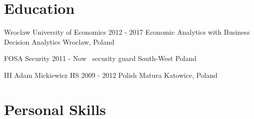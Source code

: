 \documentclass{piotrcv}
\begin{document}
\section{Education}

\begin{yearlist}


\item[Wroclaw University of Economics]
     {2012 - 2017}
     {Economic Analytics with Business Decision Analytics}
     {Wroclaw, Poland}

\item[FOSA Security]
     {2011 - Now\ }
     {security guard}
     {South-West Poland}

\item[III Adam Mickiewicz HS]
     {2009 - 2012}
     {Polish Matura}
     {Katowice, Poland}



\end{yearlist}

\section{Personal Skills}
\end{document}

